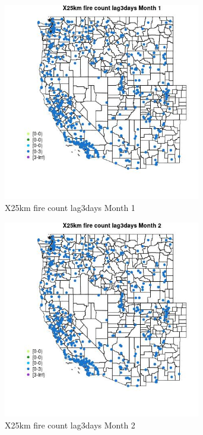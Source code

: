 \begin{figure} 
\centering  
\includegraphics[width=0.77\textwidth]{Code_Outputs/Report_ML_input_PM25_Step4_part_e_de_duplicated_aves_compiled_2019-05-14wNAs_MapObsMo1X25km_fire_count_lag3days.jpg} 
\caption{\label{fig:Report_ML_input_PM25_Step4_part_e_de_duplicated_aves_compiled_2019-05-14wNAsMapObsMo1X25km_fire_count_lag3days}X25km fire count lag3days Month 1} 
\end{figure} 
 

\clearpage 

\begin{figure} 
\centering  
\includegraphics[width=0.77\textwidth]{Code_Outputs/Report_ML_input_PM25_Step4_part_e_de_duplicated_aves_compiled_2019-05-14wNAs_MapObsMo2X25km_fire_count_lag3days.jpg} 
\caption{\label{fig:Report_ML_input_PM25_Step4_part_e_de_duplicated_aves_compiled_2019-05-14wNAsMapObsMo2X25km_fire_count_lag3days}X25km fire count lag3days Month 2} 
\end{figure} 
 

